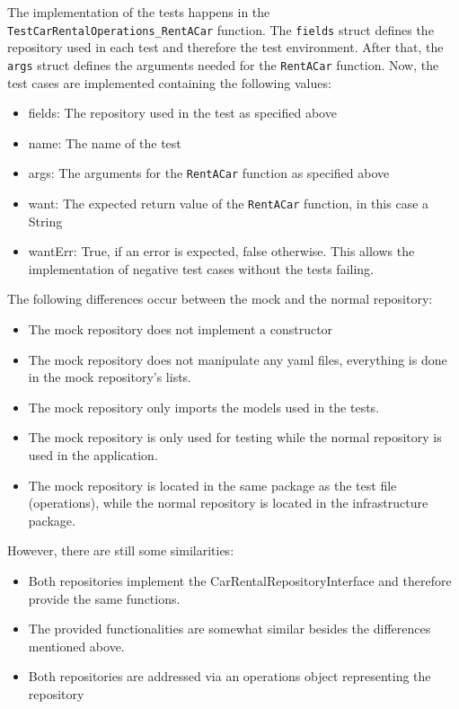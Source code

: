 The implementation of the tests happens in the \texttt{TestCarRentalOperations\_RentACar} function.
The \texttt{fields} struct defines the repository used in each test and therefore the test environment.
After that, the \texttt{args} struct defines the arguments needed for the \texttt{RentACar} function.
Now, the test cases are implemented containing the following values:
\begin{itemize}
      \item fields: The repository used in the test as specified above
      \item name: The name of the test
      \item args: The arguments for the \texttt{RentACar} function as specified above
      \item want: The expected return value of the \texttt{RentACar} function, in this case a String 
      \item wantErr: True, if an error is expected, false otherwise. 
            This allows the implementation of negative test cases without the tests failing.
\end{itemize}

The following differences occur between the mock and the normal repository:
\begin{itemize}
      \item The mock repository does not implement a constructor
      \item The mock repository does not manipulate any yaml files, everything is done in the mock repository's lists.
      \item The mock repository only imports the models used in the tests.
      \item The mock repository is only used for testing while the normal repository is used in the application.
      \item The mock repository is located in the same package as the test file (operations), while the normal repository is located in the infrastructure package.
\end{itemize}

However, there are still some similarities:
\begin{itemize}
      \item Both repositories implement the CarRentalRepositoryInterface and therefore provide the same functions.
      \item The provided functionalities are somewhat similar besides the differences mentioned above.
      \item Both repositories are addressed via an operations object representing the repository
\end{itemize}

